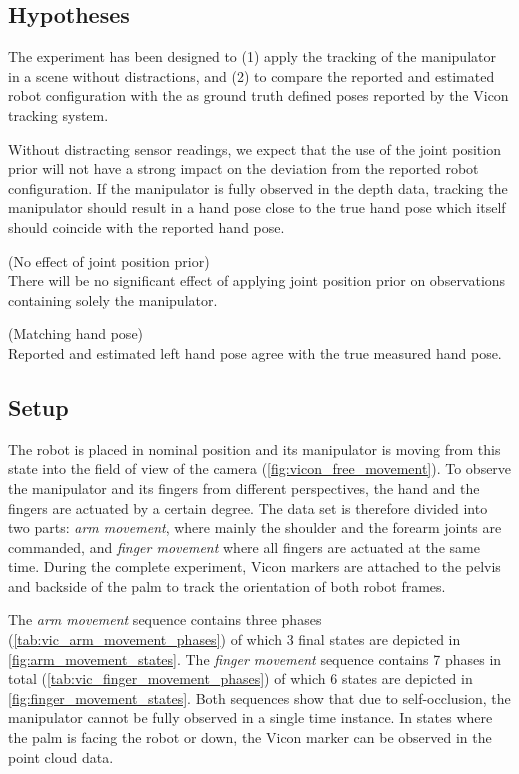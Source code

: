 \subsection{Hypotheses}

The experiment has been designed to (1) apply the tracking of the manipulator in a scene without distractions, and (2) to compare the reported and estimated robot configuration with the as ground truth defined poses reported by the Vicon tracking system.

Without distracting sensor readings, we expect that the use of the joint position prior will not have a strong impact on the deviation from the reported robot configuration. If the manipulator is fully observed in the depth data, tracking the manipulator should result in a hand pose close to the true hand pose which itself should coincide with the reported hand pose.

\begin{hypothesis}(No effect of joint position prior)\\
There will be no significant effect of applying joint position prior on observations containing solely the manipulator.
\label{hyp:no_prior_effect}
\end{hypothesis}

\begin{hypothesis}(Matching hand pose)\\
Reported and estimated left hand pose agree with the true measured hand pose.
\label{hyp:matching_hand_pose}
\end{hypothesis}


\subsection{Setup}

The robot is placed in nominal position and its manipulator is moving from this state into the field of view of the camera (\cref{fig:vicon_free_movement}). To observe the manipulator and its fingers from different perspectives, the hand and the fingers are actuated by a certain degree. The data set is therefore divided into two parts: \textit{arm movement}, where mainly the shoulder and the forearm joints are commanded, and \textit{finger movement} where all fingers are actuated at the same time. During the complete experiment, Vicon markers are attached to the pelvis and backside of the palm to track the orientation of both robot frames.

The \textit{arm movement} sequence contains three phases (\cref{tab:vic_arm_movement_phases}) of which 3 final states are depicted in \cref{fig:arm_movement_states}. The \textit{finger movement} sequence contains 7 phases in total (\cref{tab:vic_finger_movement_phases}) of which 6 states are depicted in \cref{fig:finger_movement_states}. Both sequences show that due to self-occlusion, the manipulator cannot be fully observed in a single time instance. In states where the palm is facing the robot or down, the Vicon marker can be observed in the point cloud data.

